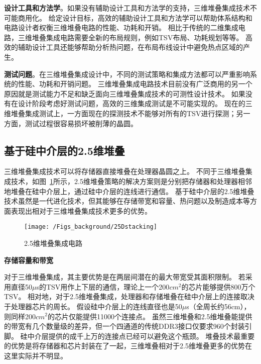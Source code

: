 \textbf{设计工具和方法学}。如果没有辅助设计工具和方法学的支持，三维堆叠集成技术不可能商用化。
给定设计目标，高效的辅助设计工具和方法学可以帮助体系结构和电路设计者权衡三维堆叠电路的性能、功耗和开销。
相比于传统的二维集成电路，三维堆叠集成电路需要全新的布局规则，例如TSV布局、功耗规划等等。
高效的辅助设计工具还能够帮助分析热问题，在布局布线设计中避免热点区域的产生。

\textbf{测试问题}。在三维堆叠集成设计中，不同的测试策略和集成方法都可以严重影响系统的性能、功耗和开销问题。
三维堆叠集成电路技术目前没有广泛商用的另一个原因就是测试能力不足和缺乏面向三维堆叠集成技术的可测性设计技术。
如果没有在设计阶段考虑好测试问题，高效的三维集成测试是不可能实现的。
现在的三维堆叠集成测试上，一方面现在的探测技术不能够对所有的TSV进行探测；另一方面，测试过程很容易损坏被削薄的晶圆。



\subsection{基于硅中介层的2.5维堆叠}

三维堆叠集成技术可以将存储器直接堆叠在处理器晶圆之上。
不同于三维堆叠集成技术，如图~\ref{fig:25Dstacking}所示，2.5维堆叠策略的解决方案则是分别把存储器和处理器相邻地堆叠在硅中介层上，通过硅中介层的连线进行通信。
基于硅中介层的2.5维堆叠技术虽然是一代进化技术，但其能够在存储带宽和容量、热问题以及制造成本等方面表现出相对于三维堆叠集成技术更多的优势。

\begin{figure}[htbp] %
  \centering
  \texttt{[image: /Figs\_background/25Dstacking]}
  \caption{2.5维堆叠集成电路}
  \label{fig:25Dstacking}
\end{figure}



\textbf{存储容量和带宽}

对于三维堆叠集成，其主要优势是在两层间潜在的最大带宽受其面积限制。
若采用直径50$\mu$s的TSV用作上下层的通信，理论上一个200$cm^{2}$的芯片能够提供800万个TSV。
相对地，对于2.5维堆叠集成，处理器和存储堆叠在硅中介层上的连接取决于处理器芯片的周长。
假设硅中介层上的连线直径也是50$\mu$s（全周长约56cm），则同样200$cm^{2}$的芯片仅能提供11000个连接点。
虽然三维堆叠和2.5维堆叠能提供的带宽有几个数量级的差异，但一个四通道的传统DDR3接口仅要求960个封装引脚。
硅中介层提供的成千上万的连接点已经可以避免这个瓶颈。
堆叠技术最重要的优势是将存储器和芯片封装在了一起，三维堆叠相对于2.5维堆叠更多的优势在这里实际并不明显。

